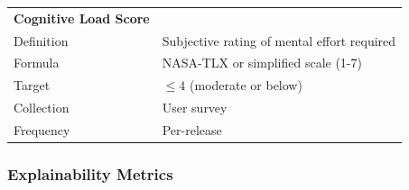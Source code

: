 \begin{table}[!htbp]
\begin{tabularx}{\linewidth}{@{}l X@{}}
\textbf{Cognitive Load Score} & \\
Definition & Subjective rating of mental effort required \\
Formula & NASA-TLX or simplified scale (1-7) \\
Target & $\leq 4$ (moderate or below) \\
Collection & User survey \\
Frequency & Per-release \\
\bottomrule
\end{tabularx}
\end{table}

\subsubsection{Explainability Metrics}

